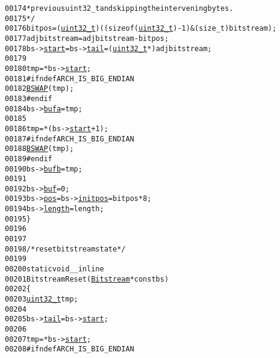 \begin{footnotesize}
\begin{alltt}
00174 \textcolor{comment}{         * previous uint32\_t and skipping the intervening bytes.}
00175 \textcolor{comment}{         */}
00176         bitpos = (\hyperlink{_types_8h_a04909d1366bb244ff2482beb51635f37}{uint32_t})((\textcolor{keyword}{sizeof}(\hyperlink{_types_8h_a04909d1366bb244ff2482beb51635f37}{uint32_t})-1) & (\textcolor{keywordtype}{size\_t})bitstream);
00177         adjbitstream = adjbitstream - bitpos;
00178         bs->\hyperlink{struct_bitstream_a4c2cb09a4fee7ed90d05f8b40914911e}{start} = bs->\hyperlink{struct_bitstream_addd740548c260796cf01e55597f749c6}{tail} = (\hyperlink{_types_8h_a04909d1366bb244ff2482beb51635f37}{uint32_t} *) adjbitstream;
00179 
00180         tmp = *bs->\hyperlink{struct_bitstream_a4c2cb09a4fee7ed90d05f8b40914911e}{start};
00181 \textcolor{preprocessor}{#ifndef ARCH\_IS\_BIG\_ENDIAN}
00182 \textcolor{preprocessor}{}        \hyperlink{_macros_8h_acd886eee9738d4807d25c1baac1e839e}{BSWAP}(tmp);
00183 \textcolor{preprocessor}{#endif}
00184 \textcolor{preprocessor}{}        bs->\hyperlink{struct_bitstream_a2b3b7e703efb5f16a9b122862f6342ff}{bufa} = tmp;
00185 
00186         tmp = *(bs->\hyperlink{struct_bitstream_a4c2cb09a4fee7ed90d05f8b40914911e}{start} + 1);
00187 \textcolor{preprocessor}{#ifndef ARCH\_IS\_BIG\_ENDIAN}
00188 \textcolor{preprocessor}{}        \hyperlink{_macros_8h_acd886eee9738d4807d25c1baac1e839e}{BSWAP}(tmp);
00189 \textcolor{preprocessor}{#endif}
00190 \textcolor{preprocessor}{}        bs->\hyperlink{struct_bitstream_af88938159f6b589af03d736e9fe8119e}{bufb} = tmp;
00191 
00192         bs->\hyperlink{struct_bitstream_aa6e7d5fa7c3bcfaac4cda5c4b07f8aa1}{buf} = 0;
00193         bs->\hyperlink{struct_bitstream_ac7479c4c4e57d10bbfdd90baf6e731a4}{pos} = bs->\hyperlink{struct_bitstream_a3234ef24b4ec8a9d06731d4f2db67418}{initpos} = bitpos*8;
00194         bs->\hyperlink{struct_bitstream_a56ea589bea2ad26a4512ff556b055fd8}{length} = length;
00195 \}
00196 
00197 
00198 \textcolor{comment}{/* reset bitstream state */}
00199 
00200 \textcolor{keyword}{static} \textcolor{keywordtype}{void} \_\_inline
00201 BitstreamReset(\hyperlink{struct_bitstream}{Bitstream} * \textcolor{keyword}{const} bs)
00202 \{
00203         \hyperlink{_types_8h_a04909d1366bb244ff2482beb51635f37}{uint32_t} tmp;
00204 
00205         bs->\hyperlink{struct_bitstream_addd740548c260796cf01e55597f749c6}{tail} = bs->\hyperlink{struct_bitstream_a4c2cb09a4fee7ed90d05f8b40914911e}{start};
00206 
00207         tmp = *bs->\hyperlink{struct_bitstream_a4c2cb09a4fee7ed90d05f8b40914911e}{start};
00208 \textcolor{preprocessor}{#ifndef ARCH\_IS\_BIG\_ENDIAN}

\end{alltt}
\end{footnotesize}
